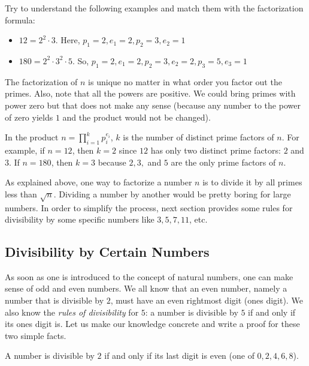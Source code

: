 \documentclass{subfile}
\begin{document}
	\begin{example}
		Try to understand the following examples and match them with the factorization formula:
		\begin{itemize}
			\item $12=2^2\cdot3$. Here, $p_1=2,e_1=2,p_2=3,e_2=1$
			\item $180=2^2\cdot 3^2\cdot 5$. So,  $p_1=2,e_1=2,p_2=3,e_2=2,p_3=5,e_3=1$
		\end{itemize}
		The factorization of $n$ is unique no matter in what order you factor out the primes. Also, note that all the powers are positive. We could bring primes with power zero but that does not make any sense (because any number to the power of zero yields $1$ and the product would not be changed).
	\end{example}

	\begin{note}
		In the product $n=\prod\limits_{i=1}^{k}p_i^{e_i}$, $k$ is the number of distinct prime factors of $n$. For example, if $n=12$, then $k=2$ since $12$ has only two distinct prime factors: $2$ and $3$. If $n=180$, then $k=3$ because $2,3,$ and $5$ are the only prime factors of $n$.
	\end{note}

	As explained above, one way to factorize a number $n$ is to divide it by all primes less than $\sqrt n$. Dividing a number by another would be pretty boring for large numbers. In order to simplify the process, next section provides some rules for divisibility by some specific numbers like $3, 5, 7, 11$, etc.

\subsection{Divisibility by Certain Numbers}\label{subs:divrules}

As soon as one is introduced to the concept of natural numbers, one can make sense of odd and even numbers. We all know that an even number, namely a number that is divisible by $2$, must have an even rightmost digit (ones digit). We also know the \textit{rules of divisibility} for $5$: a number is divisible by $5$ if and only if its ones digit is. Let us make our knowledge concrete and write a proof for these two simple facts.

	\begin{proposition}[Divisibility by $2$]
		A number is divisible by $2$ if and only if its last digit is even (one of $0,2,4,6,8$).
	\end{proposition}
\end{document}
